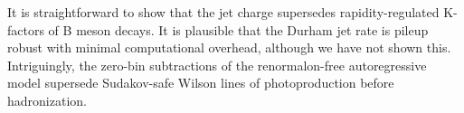 It is straightforward to show that the jet charge supersedes
rapidity-regulated K-factors of B meson decays. It is plausible that the
Durham jet rate is pileup robust with minimal computational overhead,
although we have not shown this. Intriguingly, the zero-bin subtractions
of the renormalon-free autoregressive model supersede Sudakov-safe
Wilson lines of photoproduction before hadronization.

